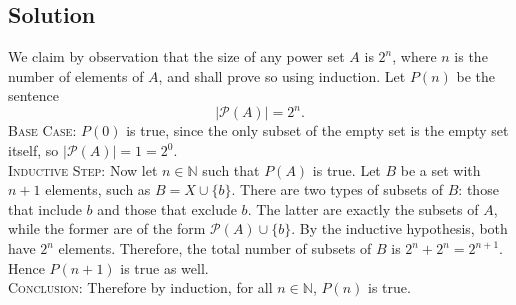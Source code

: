 \documentclass{article}
\begin{document}
\subsection*{Solution}
    We claim by observation that the size of any power set $A$ is $2^{n}$, where $n$ is the number of elements of $A$, and shall prove so using induction.
    Let $P(n)$ be the sentence $$|\mathcal{P}(A)| = 2^{n}.$$
    \textsc{Base Case}: $P(0)$ is true, since the only subset of the empty set is the empty set itself, so $|\mathcal{P}(A)| = 1 = 2^{0}$. \\
    \textsc{Inductive Step}: Now let $n \in \mathbb{N}$ such that $P(A)$ is true. Let $B$ be a set with $n + 1$ elements, such as $B = X \cup \{b\}$. There are two types of subsets of $B$: those that include $b$ and those that exclude $b$. The latter are exactly the subsets of $A$, while the former are of the form $\mathcal{P}(A) \cup \{b\}$. By the inductive hypothesis, both have $2^{n}$ elements. Therefore, the total number of subsets of $B$ is $2^{n} + 2^{n} = 2^{n + 1}$. Hence $P(n + 1)$ is true as well. \\
    \textsc{Conclusion}: Therefore by induction, for all $n \in \mathbb{N}$, $P(n)$ is true.
\end{document}
